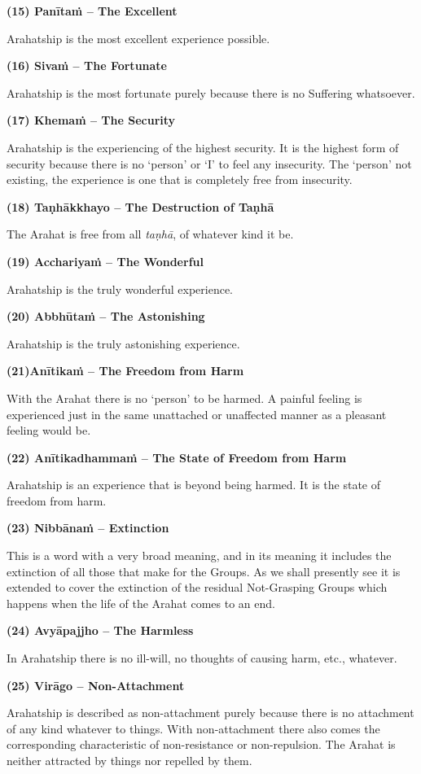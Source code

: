\textbf{(15) Panītaṁ -- The Excellent}

Arahatship is the most excellent experience possible.

\textbf{(16) Sivaṁ -- The Fortunate}

Arahatship is the most fortunate purely because there is no Suffering whatsoever.

\textbf{(17) Khemaṁ -- The Security}

Arahatship is the experiencing of the highest security. It is the highest form of security because there is no `person' or `I' to feel any insecurity. The `person' not existing, the experience is one that is completely free from insecurity.

\textbf{(18) Taṇhākkhayo -- The Destruction of Taṇhā}

The Arahat is free from all \emph{taṇhā}, of whatever kind it be.

\textbf{(19) Acchariyaṁ -- The Wonderful}

Arahatship is the truly wonderful experience.

\textbf{(20) Abbhūtaṁ -- The Astonishing}

Arahatship is the truly astonishing experience.

\textbf{(21)Anītikaṁ -- The Freedom from Harm}

With the Arahat there is no `person' to be harmed. A painful feeling is experienced just in the same unattached or unaffected manner as a pleasant feeling would be.

\textbf{(22) Anītikadhammaṁ -- The State of Freedom from Harm}

Arahatship is an experience that is beyond being harmed. It is the state of freedom from harm.

\textbf{(23) Nibbānaṁ -- Extinction}

This is a word with a very broad meaning, and in its meaning it includes the extinction of all those that make for the  Groups. As we shall presently see it is extended to cover the extinction of the residual Not-Grasping Groups which happens when the life of the Arahat comes to an end.

\textbf{(24) Avyāpajjho -- The Harmless}

In Arahatship there is no ill-will, no thoughts of causing harm, etc., whatever.

\textbf{(25) Virāgo -- Non-Attachment}

Arahatship is described as non-attachment purely because there is no attachment of any kind whatever to things. With non-attachment there also comes the corresponding characteristic of non-resistance or non-repulsion. The Arahat is neither attracted by things nor repelled by them.

